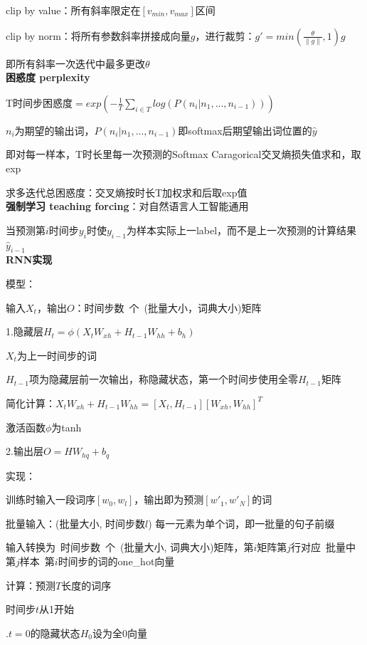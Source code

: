 \documentclass[UTF8]{ctexart}
\begin{document}
  clip by value：所有斜率限定在$[v_{min}, v_{max}]$区间

  clip by norm：将所有参数斜率拼接成向量$g$，进行裁剪：$g' = min(\frac{\theta}{\|g\|}, 1)g$
  
  \quad 即所有斜率一次迭代中最多更改$\theta$\\
\textbf{困惑度 perplexity}

  T时间步困惑度$ = exp(-\frac{1}{T}\sum_{i \in T} log(P(n_i | n_1, ..., n_{i-1})))$

  \quad $n_i$为期望的输出词，$P(n_i | n_1, ..., n_{i-1})$即softmax后期望输出词位置的$\hat{y}$

  \quad 即对每一样本，T时长里每一次预测的Softmax Caragorical交叉熵损失值求和，取exp
  
  求多迭代总困惑度：交叉熵按时长T加权求和后取exp值\\
\textbf{强制学习 teaching forcing}：对自然语言人工智能通用

  当预测第$i$时间步$y_i$时使$y_{i-1}$为样本实际上一label，而不是上一次预测的计算结果$\hat{y}_{i-1}$\\
\textbf{RNN实现}

  模型：

  \quad 输入$X_t$，输出$O$：时间步数\ 个\ (批量大小，词典大小)矩阵

  \quad 1.隐藏层$H_t = \phi(X_tW_{xh} + H_{t-1}W_{hh} + b_h)$

  \quad \quad $X_t$为上一时间步的词

  \quad \quad $H_{t-1}$项为隐藏层前一次输出，称隐藏状态，第一个时间步使用全零$H_{t-1}$矩阵

  \quad \quad 简化计算：$X_tW_{xh} + H_{t-1}W_{hh} = [X_t, H_{t-1}][W_{xh}, W_{hh}]^T$

  \quad \quad 激活函数$\phi$为tanh

  \quad 2.输出层$O = HW_{hq} + b_q$
  
  实现：

  \quad 训练时输入一段词序$[w_{0}, w_{l}]$，输出即为预测$[w'_{1}, w'_N]$的词
  
  \quad 批量输入：(批量大小, 时间步数$l$) 每一元素为单个词，即一批量的句子前缀
  
  \quad \quad 输入转换为\ 时间步数\ 个\ (批量大小, 词典大小)矩阵，第$i$矩阵第$j$行对应\ 批量中第$j$样本\ 第$i$时间步的词的one\_hot向量
    
  \quad 计算：预测$T$长度的词序

  \quad \quad 时间步$t$从1开始

  \quad {}.$t = 0$的隐藏状态$H_0$设为全0向量
\end{document}
